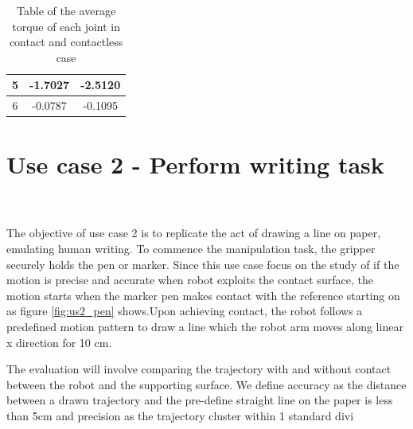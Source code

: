 \documentclass[report.tex]{subfiles}
\begin{document}
\begin{table}[H]
\begin{tabular}{c|c|c|}
    \multicolumn{1}{|c|}{5}     & -1.7027                                                      & -2.5120                                                      \\ \hline
    \multicolumn{1}{|c|}{6}     & -0.0787                                                      & -0.1095                                                      \\ \hline
    \end{tabular}%
    \caption{Table of the average torque of each joint in contact and contactless case}
    \label{tab:us1_table_torque}
    \end{table}
    \section{Use case 2 - Perform writing task}
    \paragraph{\\}
    The objective of use case 2 is to replicate the act of drawing a line on paper, emulating human writing. To commence the manipulation task, the gripper securely holds the pen or marker. Since this use case focus on the study of if the motion is precise and accurate when robot exploits the contact surface, the motion starts when the marker pen makes contact with the reference starting on as figure \ref{fig:us2_pen} shows.Upon achieving contact, the robot follows a predefined motion pattern to draw a line which the robot arm moves along linear x direction for 10 cm.
    
    The evaluation will involve comparing the trajectory with and without contact between the robot and the supporting surface. We define accuracy as the distance between a drawn trajectory and the pre-define straight line on the paper is less than 5cm and precision as the trajectory cluster within 1 standard divi
\end{document}
